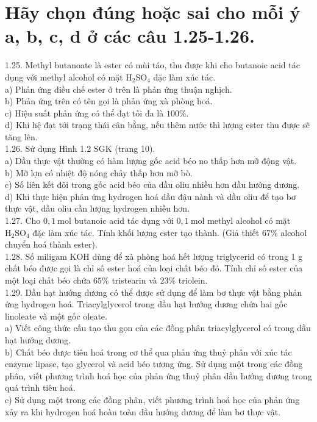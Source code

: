 \documentclass[10pt]{article}
\begin{document}
\section*{Hãy chọn đúng hoặc sai cho mỗi ý a, b, c, d ở các câu 1.25-1.26.}
1.25. Methyl butanoate là ester có mùi táo, thu được khi cho butanoic acid tác dụng với methyl alcohol có mặt $\mathrm{H}_{2} \mathrm{SO}_{4}$ đặc làm xúc tác.\\
a) Phản ứng điều chế ester ở trên là phản ứng thuận nghịch.\\
b) Phản ứng trên có tên gọi là phản ứng xà phòng hoá.\\
c) Hiệu suất phản ứng có thể đạt tối đa là $100 \%$.\\
d) Khi hệ đạt tới trạng thái cân bằng, nếu thêm nước thì lượng ester thu được sẽ tăng lên.\\
1.26. Sử dụng Hình 1.2 SGK (trang 10).\\
a) Dầu thực vật thường có hàm lượng gốc acid béo no thấp hơn mỡ động vật.\\
b) Mỡ lợn có nhiệt độ nóng chảy thấp hơn mỡ bò.\\
c) Số liên kết đôi trong gốc acid béo của dầu oliu nhiều hơn dầu hướng dương.\\
d) Khi thực hiện phản ứng hydrogen hoá dầu đậu nành và dầu oliu để tạo bơ thực vật, dầu oliu cần lượng hydrogen nhiều hơn.\\
1.27. Cho $0,1 \mathrm{~mol}$ butanoic acid tác dụng với $0,1 \mathrm{~mol}$ methyl alcohol có mặt $\mathrm{H}_{2} \mathrm{SO}_{4}$ đặc làm xúc tác. Tính khối lượng ester tạo thành. (Giả thiết $67 \%$ alcohol chuyển hoá thành ester).\\
1.28. Số miligam KOH dùng để xà phòng hoá hết lượng triglycerid có trong 1 g chất béo được gọi là chỉ số ester hoá của loại chất béo đó. Tính chỉ số ester của một loại chất béo chứa $65 \%$ tristearin và $23 \%$ triolein.\\
1.29. Dầu hạt hướng dương có thể được sử dụng để làm bơ thực vật bằng phản ứng hydrogen hoá. Triacylglycerol trong dầu hạt hướng dương chứa hai gốc linoleate và một gốc oleate.\\
a) Viết công thức cấu tạo thu gọn của các đồng phân triacylglycerol có trong dầu hạt hướng dương.\\
b) Chất béo được tiêu hoá trong cơ thể qua phản ứng thuỷ phân với xúc tác enzyme lipase, tạo glycerol và acid béo tương ứng. Sử dụng một trong các đồng phân, viết phương trình hoá học của phản ứng thuỷ phân dầu hướng dương trong quá trình tiêu hoá.\\
c) Sử dụng một trong các đồng phân, viết phương trình hoá học của phản ứng xảy ra khi hydrogen hoá hoàn toàn dầu hướng dương để làm bơ thực vật.
\end{document}
